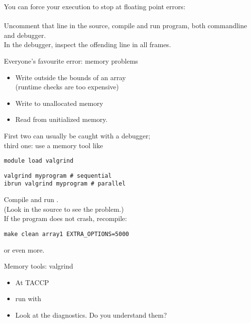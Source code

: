 \documentclass[11pt,headernav]{beamer}
\newcounter{tacc}
\begin{document}
\begin{exerciseframe}[roots]
  You can force your execution to stop at floating point errors:\\
  \\
  Uncomment that line in the source, compile and run program,
  both commandline and debugger.\\
  In the debugger, inspect the offending line in all frames.
\end{exerciseframe}

\begin{frame}[containsverbatim]{Everyone's favourite error: memory problems}
  \begin{itemize}
  \item Write outside the bounds of an array\\
    (runtime checks are too expensive)
  \item Write to unallocated memory
  \item Read from unitialized memory.
  \end{itemize}
  First two can usually be caught with a debugger;\\
  third one: use a memory tool like 
\begin{tacc}
\begin{verbatim}
module load valgrind
\end{verbatim}
\end{tacc}

\begin{verbatim}
valgrind myprogram # sequential
ibrun valgrind myprogram # parallel
\end{verbatim}
\end{frame}

\begin{exerciseframe}[array1]
  Compile and run .\\
  (Look in the source to see the problem.)\\
  If the program does not crash, recompile:
\begin{verbatim}
make clean array1 EXTRA_OPTIONS=5000
\end{verbatim}
or even more.
\end{exerciseframe}

\begin{frame}[containsverbatim]{Memory tools: valgrind}
  \begin{itemize}
  \item At TACCP 
  \item run with 
  \item Look at the diagnostics. Do you understand them?
  \end{itemize}
\end{frame}
\end{document}
